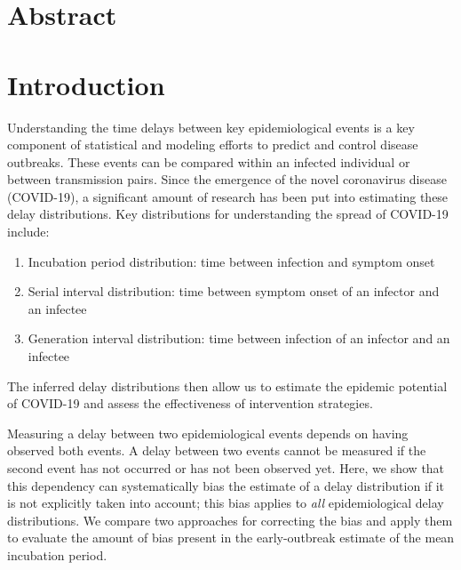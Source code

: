 \documentclass[12pt]{article}
\date{\today}
\begin{document}
\begin{flushleft}{
	\Large
	\textbf{}
}
\end{flushleft}

\section*{Abstract}

\pagebreak

\section{Introduction}

Understanding the time delays between key epidemiological events is a key component of statistical and modeling efforts to predict and control disease outbreaks.
These events can be compared within an infected individual or between transmission pairs.
Since the emergence of the novel coronavirus disease (COVID-19), a significant amount of research has been put into estimating these delay distributions.
Key distributions for understanding the spread of COVID-19 include:
\begin{enumerate}
  \item Incubation period distribution: time between infection and symptom onset \citep{backer2020incubation, li2020early, linton2020incubation, tian2020characteristics}
  \item Serial interval distribution: time between symptom onset of an infector and an infectee \citep{du2020serial, nishiura2020serial, zhao2020estimating, zhaotime}
  \item Generation interval distribution: time between infection of an infector and an infectee \citep{ganyani2020estimating}
\end{enumerate}
The inferred delay distributions then allow us to estimate the epidemic potential of COVID-19 and assess the effectiveness of intervention strategies.

Measuring a delay between two epidemiological events depends on having observed both events.
A delay between two events cannot be measured if the second event has not occurred or has not been observed yet.
Here, we show that this dependency can systematically bias the estimate of a delay distribution if it is not explicitly taken into account;
this bias applies to \emph{all} epidemiological delay distributions.
We compare two approaches for correcting the bias and apply them to evaluate the amount of bias present in the early-outbreak estimate of the mean incubation period.
\end{document}
